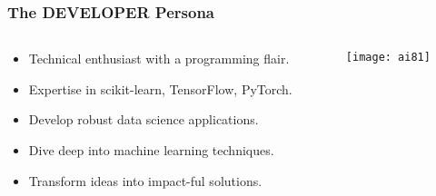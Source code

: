 \begin{frame}[fragile]\frametitle{The DEVELOPER  Persona}

\begin{columns}
    \begin{column}[T]{0.6\linewidth}
        \begin{itemize}
            \item Technical enthusiast with a programming flair.
            \item Expertise in scikit-learn, TensorFlow, PyTorch.
            \item Develop robust data science applications.
            \item Dive deep into machine learning techniques.
            \item Transform ideas into impact-ful solutions.
        \end{itemize}

    \end{column}
    \begin{column}[T]{0.4\linewidth}


			\begin{center}
			\texttt{[image: ai81]}
			\end{center}
			
    \end{column}
  \end{columns}
  
  

\end{frame}

